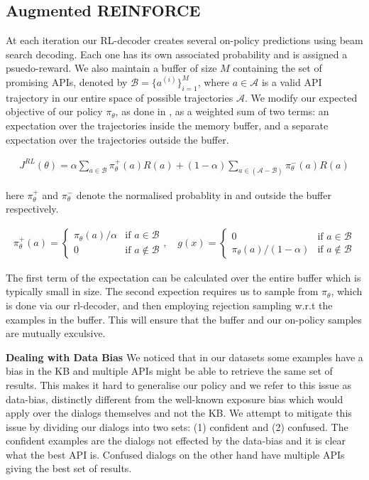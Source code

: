 \subsection{Augmented REINFORCE}
At each iteration our RL-decoder creates several on-policy predictions using beam search decoding. Each one has its own associated probability and is assigned a psuedo-reward. We also maintain a buffer of size $M$ containing the set of promising APIs, denoted by $\mathcal{B} = \bigl\{a^{(i)}\bigr\}_{i=1}^M$, where $a \in \mathcal{A}$ is a valid API trajectory in our entire space of possible trajectories $\mathcal{A}$. We modify our expected objective of our policy $\pi_\theta$, as done in \cite{NIPS2018_8204}, as a weighted sum of two terms: an expectation over the trajectories inside the memory buffer, and a separate expectation over the trajectories outside the buffer.

\begin{eqnarray}
J^{RL}(\theta) = \alpha\sum_{a\in\mathcal{B}}\pi^+_\theta(a)R(a) + (1-\alpha)\sum_{a\in(\mathcal{A}-\mathcal{B})}\pi^-_\theta(a)R(a) 
\end{eqnarray}

here $\pi^+_\theta$ and $\pi^-_\theta$ denote the normalised probablity in and outside the buffer respectively.

\begin{eqnarray*}
\pi^+_\theta(a) = \begin{cases}
             \pi_\theta(a) / \alpha  & \text{if } a \in \mathcal{B} \\
             0  & \text{if } a \notin \mathcal{B}
       \end{cases}, \quad
g(x) = \begin{cases}
             0  & \text{if } a \in \mathcal{B} \\
             \pi_\theta(a) / (1-\alpha)  & \text{if } a \notin \mathcal{B}
       \end{cases}
\end{eqnarray*}

The first term of the expectation can be calculated over the entire buffer which is typically small in size. The second expection requires us to sample from $\pi_\theta$, which is done via our rl-decoder, and then employing rejection sampling w.r.t the examples in the buffer. This will ensure that the buffer and our on-policy samples are mutually exculsive.

\noindent\textbf{Dealing with Data Bias}
We noticed that in our datasets some examples have a bias in the KB and multiple APIs might be able to retrieve the same set of results. This makes it hard to generalise our policy and we refer to this issue as data-bias, distinctly different from the well-known exposure bias which would apply over the dialogs themselves and not the KB. We attempt to mitigate this issue by dividing our dialogs into two sets: (1) confident and (2) confused. The confident examples are the dialogs not effected by the data-bias and it is clear what the best API is. Confused dialogs on the other hand have multiple APIs giving the best set of results. 

